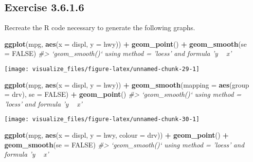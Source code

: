 \documentclass[]{book}
\newenvironment{Shaded}{\begin{snugshade}}{\end{snugshade}}
\newcommand{\CommentTok}[1]{\textcolor[rgb]{0.56,0.35,0.01}{\textit{#1}}}
\newcommand{\DataTypeTok}[1]{\textcolor[rgb]{0.13,0.29,0.53}{#1}}
\newcommand{\KeywordTok}[1]{\textcolor[rgb]{0.13,0.29,0.53}{\textbf{#1}}}
\newcommand{\NormalTok}[1]{#1}
\newcommand{\OperatorTok}[1]{\textcolor[rgb]{0.81,0.36,0.00}{\textbf{#1}}}
\newcommand{\OtherTok}[1]{\textcolor[rgb]{0.56,0.35,0.01}{#1}}
\newcommand{\StringTok}[1]{\textcolor[rgb]{0.31,0.60,0.02}{#1}}
\theoremstyle{plain}
\theoremstyle{remark}
\begin{document}
\hypertarget{exercise-3.6.1.6}{%
\subsection*{\texorpdfstring{Exercise
{3.6.1.6}}{Exercise 3.6.1.6}}\label{exercise-3.6.1.6}}

Recreate the R code necessary to generate the following graphs.

\begin{Shaded}
\begin{Highlighting}[]
\KeywordTok{ggplot}\NormalTok{(mpg, }\KeywordTok{aes}\NormalTok{(}\DataTypeTok{x =}\NormalTok{ displ, }\DataTypeTok{y =}\NormalTok{ hwy)) }\OperatorTok{+}
\StringTok{  }\KeywordTok{geom_point}\NormalTok{() }\OperatorTok{+}
\StringTok{  }\KeywordTok{geom_smooth}\NormalTok{(}\DataTypeTok{se =} \OtherTok{FALSE}\NormalTok{)}
\CommentTok{#> `geom_smooth()` using method = 'loess' and formula 'y ~ x'}
\end{Highlighting}
\end{Shaded}

\begin{center}\texttt{[image: visualize\_files/figure-latex/unnamed-chunk-29-1]} \end{center}

\begin{Shaded}
\begin{Highlighting}[]
\KeywordTok{ggplot}\NormalTok{(mpg, }\KeywordTok{aes}\NormalTok{(}\DataTypeTok{x =}\NormalTok{ displ, }\DataTypeTok{y =}\NormalTok{ hwy)) }\OperatorTok{+}
\StringTok{  }\KeywordTok{geom_smooth}\NormalTok{(}\DataTypeTok{mapping =} \KeywordTok{aes}\NormalTok{(}\DataTypeTok{group =}\NormalTok{ drv), }\DataTypeTok{se =} \OtherTok{FALSE}\NormalTok{) }\OperatorTok{+}
\StringTok{  }\KeywordTok{geom_point}\NormalTok{()}
\CommentTok{#> `geom_smooth()` using method = 'loess' and formula 'y ~ x'}
\end{Highlighting}
\end{Shaded}

\begin{center}\texttt{[image: visualize\_files/figure-latex/unnamed-chunk-30-1]} \end{center}

\begin{Shaded}
\begin{Highlighting}[]
\KeywordTok{ggplot}\NormalTok{(mpg, }\KeywordTok{aes}\NormalTok{(}\DataTypeTok{x =}\NormalTok{ displ, }\DataTypeTok{y =}\NormalTok{ hwy, }\DataTypeTok{colour =}\NormalTok{ drv)) }\OperatorTok{+}
\StringTok{  }\KeywordTok{geom_point}\NormalTok{() }\OperatorTok{+}
\StringTok{  }\KeywordTok{geom_smooth}\NormalTok{(}\DataTypeTok{se =} \OtherTok{FALSE}\NormalTok{)}
\CommentTok{#> `geom_smooth()` using method = 'loess' and formula 'y ~ x'}
\end{Highlighting}
\end{Shaded}
\end{document}
